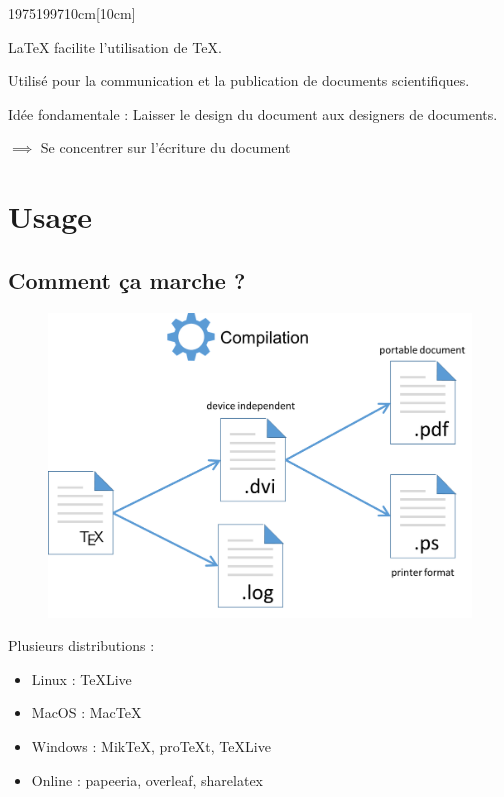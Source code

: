 \documentclass{beamer}
\begin{document}
\begin{frame}
	\begin{chronology}[5]{1975}{1997}{10cm}[10cm]
	\end{chronology}
	LaTeX facilite l'utilisation de TeX.
\end{frame}

\begin{frame}
	Utilisé pour la communication et la publication de documents scientifiques.
				
	\begin{block}{Idée fondamentale : }
		Laisser le design du document aux designers de documents.
	\end{block}
	$\implies$ Se concentrer sur l'écriture du document
\end{frame}

\section{Usage}
\subsection{Comment ça marche ?}
\begin{frame}
	\begin{figure}[!ht]
		\begin{center}
			\includegraphics[width=0.60\linewidth, keepaspectratio]{images/compilationLatex.png}
		\end{center}
	\end{figure}
	
	Plusieurs distributions : 
	\begin{itemize}
		\item Linux : \TeX Live
		\item MacOS : Mac\TeX
		\item Windows : Mik\TeX, pro\TeX t, \TeX Live
		\item Online : papeeria, overleaf, sharelatex %
	\end{itemize}
\end{frame}
\end{document}
